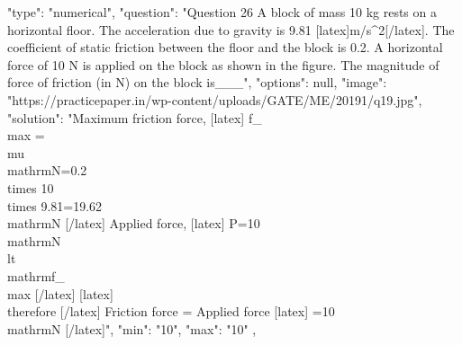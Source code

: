   {
    "type": "numerical",
    "question": "Question 26 A block of mass 10 kg rests on a horizontal floor. The acceleration due to gravity is 9.81 [latex]m/s^2[/latex]. The coefficient of static friction between the floor and the block is 0.2. A horizontal force of 10 N is applied on the block as shown in the figure. The magnitude of force of friction (in N) on the block is___",
    "options": null,
    "image": "https://practicepaper.in/wp-content/uploads/GATE/ME/20191/q19.jpg",
    "solution": "Maximum friction force, [latex] f_{\\max }=\\mu \\mathrm{N}=0.2 \\times 10 \\times 9.81=19.62 \\mathrm{N} [/latex] Applied force, [latex] P=10 \\mathrm{N} \\lt \\mathrm{f}_{\\max } [/latex] [latex] \\therefore [/latex]  Friction force = Applied force [latex] =10 \\mathrm{N} [/latex]",
    "min": "10",
    "max": "10"
  },
